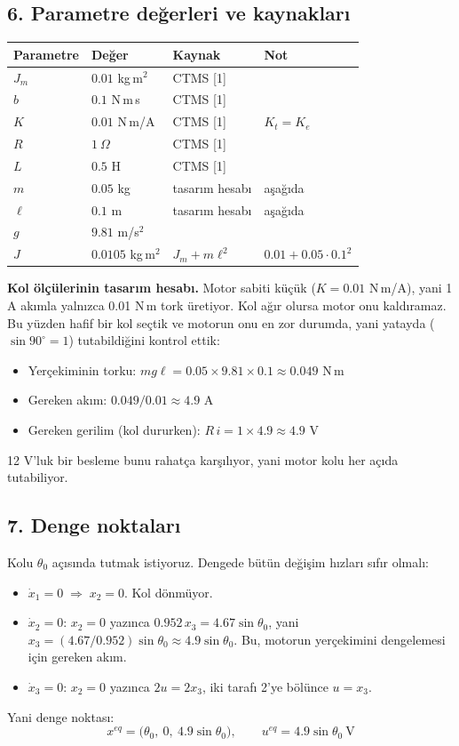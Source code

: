 \documentclass[11pt,a4paper]{article}
\begin{document}
\subsection*{6. Parametre değerleri ve kaynakları}

\begin{center}
\begin{tabular}{llll}
\toprule
Parametre & Değer & Kaynak & Not\\
\midrule
$J_m$ & $0.01$ kg\,m$^2$ & CTMS [1] & \\
$b$ & $0.1$ N\,m\,s & CTMS [1] & \\
$K$ & $0.01$ N\,m/A & CTMS [1] & $K_t = K_e$\\
$R$ & $1\ \Omega$ & CTMS [1] & \\
$L$ & $0.5$ H & CTMS [1] & \\
$m$ & $0.05$ kg & tasarım hesabı & aşağıda\\
$\ell$ & $0.1$ m & tasarım hesabı & aşağıda\\
$g$ & $9.81$ m/s$^2$ & & \\
$J$ & $0.0105$ kg\,m$^2$ & $J_m + m\ell^2$ & $0.01 + 0.05\cdot 0.1^2$\\
\bottomrule
\end{tabular}
\end{center}

\textbf{Kol ölçülerinin tasarım hesabı.} Motor sabiti küçük ($K = 0.01$ N\,m/A), yani 1 A akımla yalnızca 0.01 N\,m tork üretiyor. Kol ağır olursa motor onu kaldıramaz. Bu yüzden hafif bir kol seçtik ve motorun onu en zor durumda, yani yatayda ($\sin 90^\circ = 1$) tutabildiğini kontrol ettik:
\begin{itemize}[leftmargin=*]
  \item Yerçekiminin torku: $mg\ell = 0.05 \times 9.81 \times 0.1 \approx 0.049$ N\,m
  \item Gereken akım: $0.049 / 0.01 \approx 4.9$ A
  \item Gereken gerilim (kol dururken): $R\,i = 1 \times 4.9 \approx 4.9$ V
\end{itemize}
12 V'luk bir besleme bunu rahatça karşılıyor, yani motor kolu her açıda tutabiliyor.

\subsection*{7. Denge noktaları}

Kolu $\theta_0$ açısında tutmak istiyoruz. Dengede bütün değişim hızları sıfır olmalı:
\begin{itemize}[leftmargin=*]
  \item $\dot x_1 = 0 \;\Rightarrow\; x_2 = 0$. Kol dönmüyor.
  \item $\dot x_2 = 0$: $x_2 = 0$ yazınca $0.952\,x_3 = 4.67\sin\theta_0$, yani $x_3 = (4.67/0.952)\sin\theta_0 \approx 4.9\sin\theta_0$. Bu, motorun yerçekimini dengelemesi için gereken akım.
  \item $\dot x_3 = 0$: $x_2 = 0$ yazınca $2u = 2x_3$, iki tarafı 2'ye bölünce $u = x_3$.
\end{itemize}
Yani denge noktası:
\[
x^{eq} = \big(\theta_0,\ 0,\ 4.9\sin\theta_0\big), \qquad u^{eq} = 4.9\sin\theta_0\ \text{V}
\]
\end{document}

